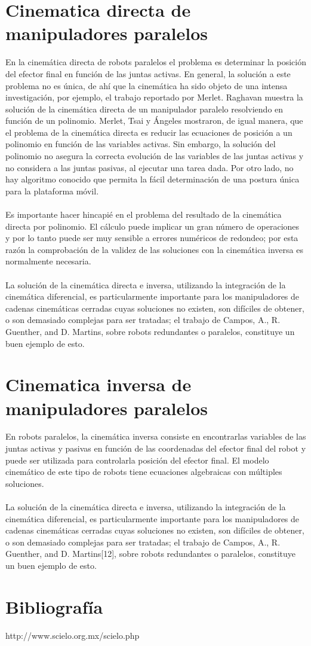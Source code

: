 \documentclass[12pt,a4paper]{article}
\begin{document}
\tableofcontents

\section{Cinematica directa de manipuladores paralelos}
En la cinemática directa de robots paralelos el problema es determinar la posición del efector final en función de las juntas activas. En general, la solución a este problema no es única, de ahí que la cinemática ha sido objeto de una intensa investigación, por ejemplo, el trabajo reportado por Merlet. Raghavan muestra la solución de la cinemática directa de un manipulador paralelo resolviendo en función de un polinomio. Merlet, Tsai y Ángeles mostraron, de igual manera, que el problema de la cinemática directa es reducir las ecuaciones de posición a un polinomio en función de las variables activas. Sin embargo, la solución del polinomio no asegura la correcta evolución de las variables de las juntas activas y no considera a las juntas pasivas, al ejecutar una tarea dada. Por otro lado, no hay algoritmo conocido que permita la fácil determinación de una postura única para la plataforma móvil.\\\\
Es importante hacer hincapié en el problema del resultado de la cinemática directa por polinomio. El cálculo puede implicar un gran número de operaciones y por lo tanto puede ser muy sensible a errores numéricos de redondeo; por esta razón la comprobación de la validez de las soluciones con la cinemática inversa es normalmente necesaria.\\\\
La solución de la cinemática directa e inversa, utilizando la integración de la cinemática diferencial, es particularmente importante para los manipuladores de cadenas cinemáticas cerradas cuyas soluciones no existen, son difíciles de obtener, o son demasiado complejas para ser tratadas; el trabajo de Campos, A., R. Guenther, and D. Martins, sobre robots redundantes o paralelos, constituye un buen ejemplo de esto.

\section{Cinematica inversa de manipuladores paralelos}
En robots paralelos, la cinemática inversa consiste en encontrarlas variables de las juntas activas y pasivas en función de las coordenadas del efector final del robot y puede ser utilizada para controlarla posición del efector final. El modelo cinemático de este tipo de robots tiene ecuaciones algebraicas con múltiples soluciones.\\\\
La solución de la cinemática directa e inversa, utilizando la integración de la cinemática diferencial, es particularmente importante para los manipuladores de cadenas cinemáticas cerradas cuyas soluciones no existen, son difíciles de obtener, o son demasiado complejas para ser tratadas; el trabajo de Campos, A., R. Guenther, and D. Martins[12], sobre robots redundantes o paralelos, constituye un buen ejemplo de esto.\\

\section{Bibliografía}
http://www.scielo.org.mx/scielo.php
\end{document}
